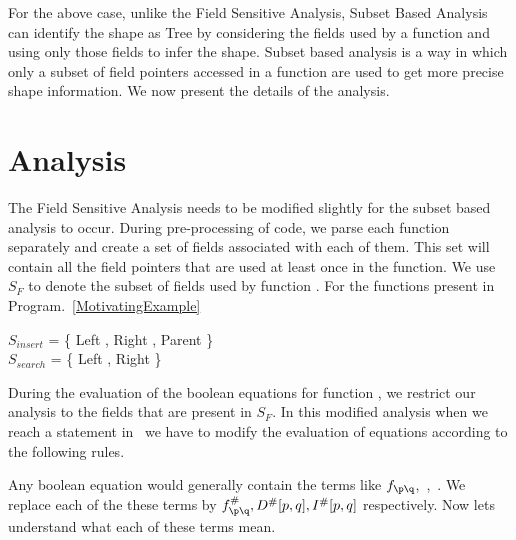 For the above case, unlike the Field Sensitive Analysis, Subset Based Analysis can  identify the shape as Tree by considering the fields used by a 
function and using only those fields to infer the shape. Subset based analysis is a way in which only a subset of field pointers accessed in a 
function are used to get more precise shape information. We now present the details of the analysis.

\section{Analysis}    
The Field Sensitive Analysis needs to be modified slightly for the subset based analysis to occur.
During pre-processing of code, we parse each function separately and create a set of fields associated with each of them. This set will contain
all the field pointers that are used at least once in the function. We use $S_F$ to denote the subset of fields used by function \F.
For the functions present in  Program.~\ref{MotivatingExample}

\begin{center}
$S_{insert}$ = \{ Left , Right , Parent \} \\
$S_{search}$ = \{ Left , Right \} \\ 
\end{center}

During the evaluation of the boolean equations for function \F, we restrict our analysis to the fields that are present in $S_F$.
In this modified analysis when we reach a statement in \F\ we have to modify the evaluation of equations according to the following rules.

Any boolean equation would generally contain the  terms like $f_{\p\q}$,\ \DFM{\p}{\q},\ \IFM{\p}{\q}.
We replace each of the these terms by $f_{\p\q}^{\#} , {D^{\#}[p,q]} ,{I^{\#}[p,q]}$ respectively. Now lets 
understand what each of these terms mean.

